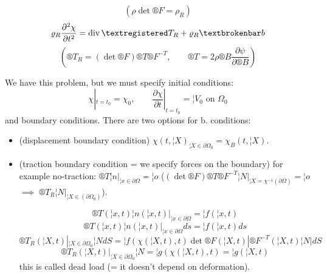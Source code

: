\documentclass[12pt]{article}					%
\begin{document}
\begin{poznamka}
	$$ (\rho \det ®F = \rho_R) $$
	$$ \rho_R \frac{\partial^2 \chi}{\partial t^2} = \Div ®T_R + \rho_R ¦b $$
	$$ (®T_R = (\det ®F)®T®F^{-T}, \qquad ®T = 2\rho ®B \frac{\partial \psi}{\partial ®B}) $$

	We have this problem, but we must specify initial conditions:
	$$ \chi|_{t = t_0} = \chi_0, \qquad \frac{\partial \chi}{\partial t}|_{t=t_0} = ¦V_0 \text{ on }\Omega_0 $$
	and boundary conditions. There are two options for b. conditions:
	\begin{itemize}
		\item (displacement boundary condition) $\chi(t, ¦X)_{¦X \in \partial \Omega_0} = \chi_B(t, ¦X)$.
		\item (traction boundary condition = we specify forces on the boundary) for example no-traction: $®T¦n |_{¦x \in \partial \Omega} = ¦o$ ($(\det ®F) ®T ®F^{-T}¦N|_{¦X = \chi^{-1}(\partial \Omega)} = ¦o$ $\implies$ $®T_R ¦N|_{¦X \in (\partial \Omega_0)}$).

			$$ ®T(¦x, t)¦n(¦x, t)|_{¦x \in \partial \Omega} = ¦f(¦x, t) $$
			$$ ®T(¦x, t)¦n(¦x, t)|_{¦x \in \partial \Omega} ds = ¦f(¦x, t) ds $$
			$$ ®T_R(¦X, t)|_{¦X \in \partial\Omega_0} ¦NdS = ¦f(\chi(¦X, t), t)\det ®F(¦X, t) |®F^{-T}(¦X, t)¦N| dS $$
			$$ ®T_R(¦X, t)|_{¦X \in \partial\Omega_0} ¦N = ¦g(\chi(¦X, t), t) = ¦g(¦X, t) $$
			this is called dead load (= it doesn't depend on deformation).
	\end{itemize}
\end{poznamka}

\end{document}
